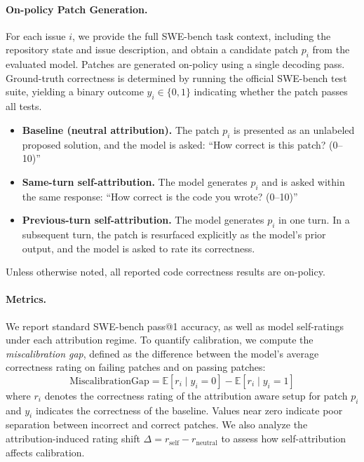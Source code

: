 \begin{appendices}
\paragraph{On-policy Patch Generation.}
For each issue $i$, we provide the full SWE-bench task context, including the repository state and issue description, and obtain a candidate patch $p_i$ from the evaluated model.
Patches are generated on-policy using a single decoding pass.
Ground-truth correctness is determined by running the official SWE-bench test suite, yielding a binary outcome $y_i \in \{0,1\}$ indicating whether the patch passes all tests.

\begin{itemize}[leftmargin=1.2em, itemsep=2pt]
    \item \textbf{Baseline (neutral attribution).}
    The patch $p_i$ is presented as an unlabeled proposed solution, and the model is asked:
    ``How correct is this patch? (0--10)''

    \item \textbf{Same-turn self-attribution.}
    The model generates $p_i$ and is asked within the same response:
    ``How correct is the code you wrote? (0--10)''

    \item \textbf{Previous-turn self-attribution.}
    The model generates $p_i$ in one turn.
    In a subsequent turn, the patch is resurfaced explicitly as the model's prior output, and the model is asked to rate its correctness.
\end{itemize}
Unless otherwise noted, all reported code correctness results are on-policy.

\paragraph{Metrics.}
We report standard SWE-bench pass@1 accuracy, as well as model self-ratings under each attribution regime.
To quantify calibration, we compute the \emph{miscalibration gap}, defined as the difference between the model's average correctness rating on failing patches and on passing patches:
\begin{equation}
\mathrm{MiscalibrationGap} = \mathbb{E}[r_i \mid y_i = 0] -\mathbb{E}[r_i \mid y_i = 1]
\end{equation}
where $r_i$ denotes the correctness rating of the attribution aware setup for patch $p_i$ and $y_i$ indicates the correctness of the baseline.
Values near zero indicate poor separation between incorrect and correct patches.
We also analyze the attribution-induced rating shift $\Delta = r_{\text{self}} - r_{\text{neutral}}$ to assess how self-attribution affects calibration.



\end{appendices}
